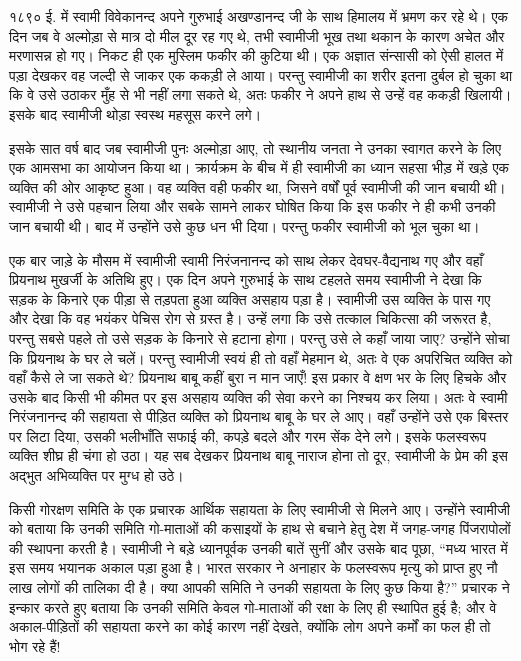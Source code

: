 \delimiter

१८९० ई. में स्वामी विवेकानन्द अपने गुरुभाई अखण्डानन्द जी के साथ हिमालय में भ्रमण कर रहे थे। एक दिन जब वे अल्मोड़ा से मात्र दो मील दूर रह गए थे, तभी स्वामीजी भूख तथा थकान के कारण अचेत और मरणासन्न हो गए। निकट ही एक मुस्लिम फकीर की कुटिया थी। एक अज्ञात संन्सासी को ऐसी हालत में पड़ा देखकर वह जल्दी से जाकर एक ककड़ी ले आया। परन्तु स्वामीजी का शरीर इतना दुर्बल हो चुका था कि वे उसे उठाकर मुँह से भी नहीं लगा सकते थे, अतः फकीर ने अपने हाथ से उन्हें वह ककड़ी खिलायी। इसके बाद स्वामीजी थोड़ा स्वस्थ महसूस करने लगे। 

इसके सात वर्ष बाद जब स्वामीजी पुनः अल्मोड़ा आए, तो स्थानीय जनता ने उनका स्वागत करने के लिए एक आमसभा का आयोजन किया था। क्रार्यक्रम के बीच में ही स्वामीजी का ध्यान सहसा भीड़ में खड़े एक व्यक्ति की ओर आकृष्ट हुआ। वह व्यक्ति वही फकीर था, जिसने वर्षों पूर्व स्वामीजी की जान बचायी थी। स्वामीजी ने उसे पहचान लिया और सबके सामने लाकर घोषित किया कि इस फकीर ने ही कभी उनकी जान बचायी थी। बाद में उन्होंने उसे कुछ धन भी दिया। परन्तु फकीर स्वामीजी को भूल चुका था। 

\delimiter

एक बार जाड़े के मौसम में स्वामीजी स्वामी निरंजनानन्द को साथ लेकर देवघर-वैद्यनाथ गए और वहाँ प्रियनाथ मुखर्जी के अतिथि हुए। एक दिन अपने गुरुभाई के साथ टहलते समय स्वामीजी ने देखा कि सड़क के किनारे एक पीड़ा से तड़पता हुआ व्यक्ति असहाय पड़ा है। स्वामीजी उस व्यक्ति के पास गए और देखा कि वह भयंकर पेचिस रोग से ग्रस्त है। उन्हें लगा कि उसे तत्काल चिकित्सा की जरूरत है, परन्तु सबसे पहले तो उसे सड़क के किनारे से हटाना होगा। परन्तु उसे ले कहाँ जाया जाए? उन्होंने सोचा कि प्रियनाथ के घर ले चलें। परन्तु स्वामीजी स्वयं ही तो वहाँ मेहमान थे, अतः वे एक अपरिचित व्यक्ति को वहाँ कैसे ले जा सकते थे? प्रियनाथ बाबू कहीं बुरा न मान जाएँ! इस प्रकार वे क्षण भर के लिए हिचके और उसके बाद किसी भी कीमत पर इस असहाय व्यक्ति की सेवा करने का निश्चय कर लिया। अतः वे स्वामी निरंजनानन्द की सहायता से पीड़ित व्यक्ति को प्रियनाथ बाबू के घर ले आए। वहाँ उन्होंने उसे एक बिस्तर पर लिटा दिया, उसकी भलीभाँति सफाई की, कपड़े बदले और गरम सेंक देने लगे। इसके फलस्वरूप व्यक्ति शीघ्र ही चंगा हो उठा। यह सब देखकर प्रियनाथ बाबू नाराज होना तो दूर, स्वामीजी के प्रेम की इस अद्भुत अभिव्यक्ति पर मुग्ध हो उठे। 

\delimiter

किसी गोरक्षण समिति के एक प्रचारक आर्थिक सहायता के लिए स्वामीजी से मिलने आए। उन्होंने स्वामीजी को बताया कि उनकी समिति गो-माताओं की कसाइयों के हाथ से बचाने हेतु देश में जगह-जगह पिंजरापोलों की स्थापना करती है। स्वामीजी ने बड़े ध्यानपूर्वक उनकी बातें सुनीं और उसके बाद पूछा, “मध्य भारत में इस समय भयानक अकाल पड़ा हुआ है। भारत सरकार ने अनाहार के फलस्वरूप मृत्यु को प्राप्त हुए नौ लाख लोगों की तालिका दी है। क्या आपकी समिति ने उनकी सहायता के लिए कुछ किया है?” प्रचारक ने इन्कार करते हुए बताया कि उनकी समिति केवल गो-माताओं की रक्षा के लिए ही स्थापित हुई है; और वे अकाल-पीड़ितों की सहायता करने का कोई कारण नहीं देखते, क्योंकि लोग अपने कर्मों का फल ही तो भोग रहे हैं! 

